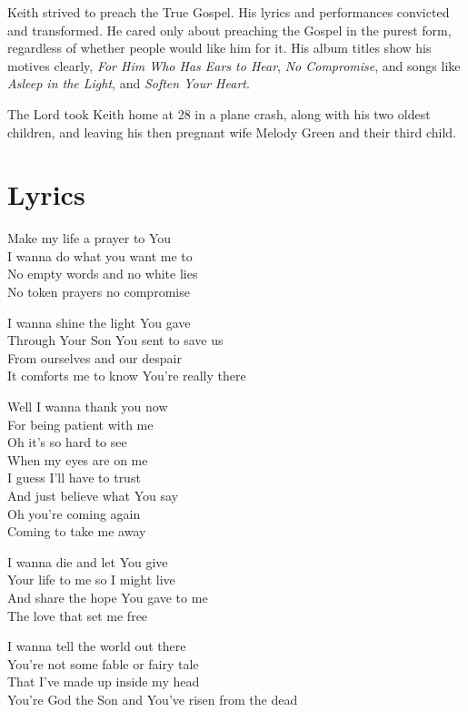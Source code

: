 \documentclass[10pt,a4paper,oneside,twocolumn]{book}
\begin{document}
Keith strived to preach the True Gospel. His lyrics and performances convicted and transformed. He cared only about preaching the Gospel in the purest form, regardless of whether people would like him for it. His album titles show his motives clearly, \textit{For Him Who Has Ears to Hear}, \textit{No Compromise}, and songs like \textit{Asleep in the Light}, and \textit{Soften Your Heart}.

The Lord took Keith home at 28 in a plane crash, along with his two oldest children, and leaving his then pregnant wife Melody Green and their third child.

\section{Lyrics}
\begin{flushleft}
Make my life a prayer to You\\
I wanna do what you want me to\\
No empty words and no white lies\\
No token prayers no compromise
\medskip 


I wanna shine the light You gave\\
Through Your Son You sent to save us\\
From ourselves and our despair\\
It comforts me to know You're really there
\medskip 

Well I wanna thank you now\\
For being patient with me\\
Oh it's so hard to see\\
When my eyes are on me\\
I guess I'll have to trust\\
And just believe what You say\\
Oh you're coming again\\
Coming to take me away
\medskip 

I wanna die and let You give\\
Your life to me so I might live\\
And share the hope You gave to me\\
The love that set me free\\
\medskip 

I wanna tell the world out there\\
You're not some fable or fairy tale\\
That I've made up inside my head\\
You're God the Son and You've risen from the dead
\end{flushleft}
\end{document}
